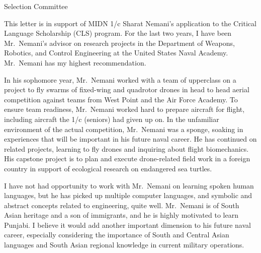 \documentclass[12pt]{wrceletter}
\date{\today}
\begin{document}
\begin{letter}{%
Selection Committee}

\opening{}
This letter is in support of MIDN 1/c Sharat Nemani’s application to the Critical Language Scholarship (CLS) program. For the last two years, I have been Mr.~Nemani’s advisor on research projects in the Department of Weapons, Robotics, and Control Engineering at the United States Naval Academy. Mr.~Nemani has my highest recommendation.
 
In his sophomore year, Mr.~Nemani worked with a team of upperclass on a project to fly swarms of fixed-wing and quadrotor drones in head to head aerial competition against teams from West Point and the Air Force Academy. To ensure team readiness, Mr.~Nemani worked hard to prepare aircraft for flight, including aircraft the 1/c (seniors) had given up on. In the unfamiliar environment of the actual competition, Mr.~Nemani was a sponge, soaking in experiences that will be important in his future naval career. He has continued on related projects, learning to fly drones and inquiring about flight biomechanics. His capstone project is to plan and execute drone-related field work in a foreign country in support of ecological research on endangered sea turtles.
 
I have not had opportunity to work with Mr.~Nemani on learning spoken human languages, but he has picked up multiple computer languages, and symbolic and abstract concepts related to engineering, quite well. Mr.~Nemani is of South Asian heritage and a son of immigrants, and he is highly motivated to learn Punjabi. I believe it would add another important dimension to his future naval career, especially considering the importance of South and Central Asian languages and South Asian regional knowledge in current military operations.

\closing{~} %

\end{letter}
\end{document}
